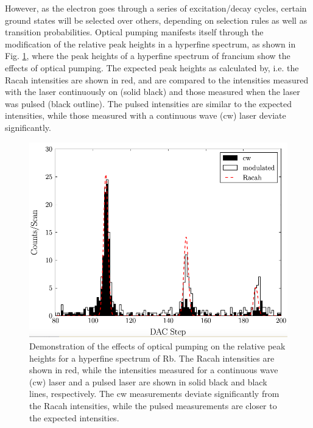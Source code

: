 However, as the electron goes through a series of excitation/decay cycles, certain ground states will be selected over others, depending on selection rules as well as transition probabilities. Optical pumping manifests itself through the modification of the relative peak heights in a hyperfine spectrum, as shown in Fig. \ref{OP_francium}, where the peak heights of a hyperfine spectrum of francium show the effects of optical pumping. The expected peak heights as calculated by, i.e. the Racah intensities are shown in red, and are compared to the intensities measured with the laser continuously on (solid black) and those measured when the laser was pulsed (black outline). The pulsed intensities are similar to the expected intensities, while those measured with a continuous wave (cw) laser deviate significantly.
\begin{figure}[h]
\includegraphics[width=\textwidth]{Graphics/francium.png}
\small
\caption{Demonstration of the effects of optical pumping on the relative peak heights for a hyperfine spectrum of Rb. The Racah intensities are shown in red, while the intensities measured for a continuous wave (cw) laser and a pulsed laser are shown in solid black and black lines, respectively. The cw measurements deviate significantly from the Racah intensities, while the pulsed measurements are closer to the expected intensities.\cite{CFBS}}
\label{OP_francium}
\end{figure}

